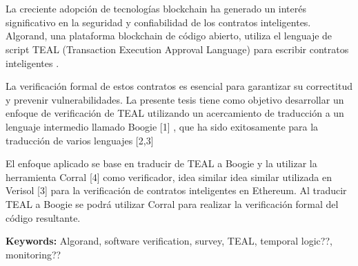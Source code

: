 \chapter*{\runtitle}

\noindent La creciente adopción de tecnologías blockchain ha generado un interés significativo en la seguridad y confiabilidad de los contratos inteligentes. Algorand, una plataforma blockchain de código abierto, utiliza el lenguaje de script TEAL (Transaction Execution Approval Language) para escribir contratos inteligentes .

La verificación formal de estos contratos es esencial para garantizar su correctitud y prevenir vulnerabilidades. La presente tesis tiene como objetivo desarrollar un enfoque de verificación de TEAL utilizando un acercamiento de traducción a un lenguaje intermedio llamado Boogie [1] , que ha sido exitosamente para la traducción de varios lenguajes [2,3]

El enfoque aplicado se base en traducir de TEAL a Boogie y la utilizar la herramienta Corral [4] como verificador, idea similar idea similar utilizada en Verisol [3] para la verificación de contratos inteligentes en Ethereum. Al traducir TEAL a Boogie se podrá utilizar Corral para realizar la verificación formal del código resultante.


\bigskip

\noindent\textbf{Keywords:} Algorand, software verification, survey, TEAL, temporal logic??, monitoring?? %